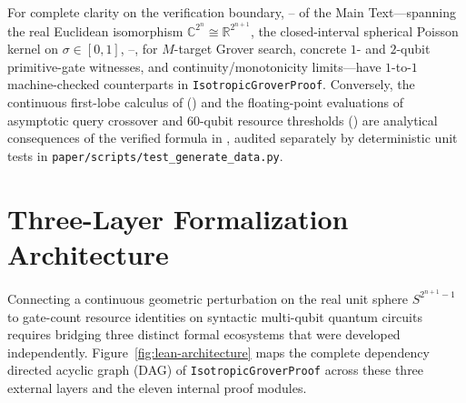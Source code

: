 For complete clarity on the verification boundary, -- of the Main Text---spanning the real Euclidean isomorphism $\mathbb{C}^{2^n} \cong \mathbb{R}^{2^{n+1}}$, the closed-interval spherical Poisson kernel on $\sigma \in [0, 1]$, --,  for $M$-target Grover search, concrete $1$- and $2$-qubit primitive-gate witnesses, and continuity/monotonicity limits---have $1$-to-$1$ machine-checked counterparts in \texttt{IsotropicGroverProof}. Conversely, the continuous first-lobe calculus of  () and the floating-point evaluations of asymptotic query crossover and $60$-qubit resource thresholds () are analytical consequences of the verified formula in , audited separately by deterministic unit tests in \texttt{paper/scripts/test\_generate\_data.py}.

\section{Three-Layer Formalization Architecture}
\label{sec:supp-architecture}

Connecting a continuous geometric perturbation on the real unit sphere $S^{2^{n+1}-1}$ to gate-count resource identities on syntactic multi-qubit quantum circuits requires bridging three distinct formal ecosystems that were developed independently. Figure~\ref{fig:lean-architecture} maps the complete dependency directed acyclic graph (DAG) of \texttt{IsotropicGroverProof} across these three external layers and the eleven internal proof modules.




